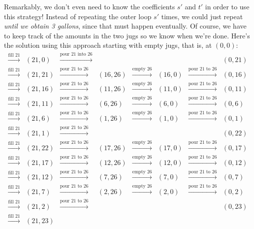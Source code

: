 Remarkably, we don't even need to know the coefficients $s'$ and $t'$
in order to use this strategy!  Instead of repeating the outer loop
$s'$ times, we could just repeat \emph{until we obtain 3 gallons},
since that must happen eventually.  Of course, we have to keep track
of the amounts in the two jugs so we know when we're done.  Here's the
solution using this approach starting with empty jugs, that is, at
$(0,0)$:
\[
\begin{array}{cccccccc}
\xrightarrow{\text{fill 21}} & (21,0)& \xrightarrow{\text{pour 21 into
    26}} & & & &&(0,21)\\ \xrightarrow{\text{fill 21}} & (21,21)&
\xrightarrow{\text{pour 21 to 26}} & (16,26)& \xrightarrow{\text{empty
    26}} & (16,0)& \xrightarrow{\text{pour 21 to 26}} &
(0,16)\\ \xrightarrow{\text{fill 21}} & (21,16)&
\xrightarrow{\text{pour 21 to 26}} & (11,26)& \xrightarrow{\text{empty
    26}} & (11,0)& \xrightarrow{\text{pour 21 to 26}} &
(0,11)\\ \xrightarrow{\text{fill 21}} & (21,11)&
\xrightarrow{\text{pour 21 to 26}} & (6,26)& \xrightarrow{\text{empty
    26}} & (6,0)& \xrightarrow{\text{pour 21 to 26}} &
(0,6)\\ \xrightarrow{\text{fill 21}} & (21,6)& \xrightarrow{\text{pour
    21 to 26}} & (1,26)& \xrightarrow{\text{empty 26}} & (1,0)&
\xrightarrow{\text{pour 21 to 26}} & (0,1)\\ \xrightarrow{\text{fill
    21}} & (21,1)& \xrightarrow{\text{pour 21 to 26}} &&&&&
(0,22)\\ \xrightarrow{\text{fill 21}} & (21,22)&
\xrightarrow{\text{pour 21 to 26}} & (17,26)& \xrightarrow{\text{empty
    26}} & (17,0)& \xrightarrow{\text{pour 21 to 26}} &
(0,17)\\ \xrightarrow{\text{fill 21}} & (21,17)&
\xrightarrow{\text{pour 21 to 26}} & (12,26)& \xrightarrow{\text{empty
    26}} & (12,0)& \xrightarrow{\text{pour 21 to 26}} &
(0,12)\\ \xrightarrow{\text{fill 21}} & (21,12)&
\xrightarrow{\text{pour 21 to 26}} & (7,26)& \xrightarrow{\text{empty
    26}} & (7,0)& \xrightarrow{\text{pour 21 to 26}} &
(0,7)\\ \xrightarrow{\text{fill 21}} & (21,7)& \xrightarrow{\text{pour
    21 to 26}} & (2,26)& \xrightarrow{\text{empty 26}} & (2,0)&
\xrightarrow{\text{pour 21 to 26}} & (0,2)\\ \xrightarrow{\text{fill
    21}} & (21,2)& \xrightarrow{\text{pour 21 to 26}} &
&&&&(0,23)\\ \xrightarrow{\text{fill 21}} & (21,23)&

\end{array}\]
